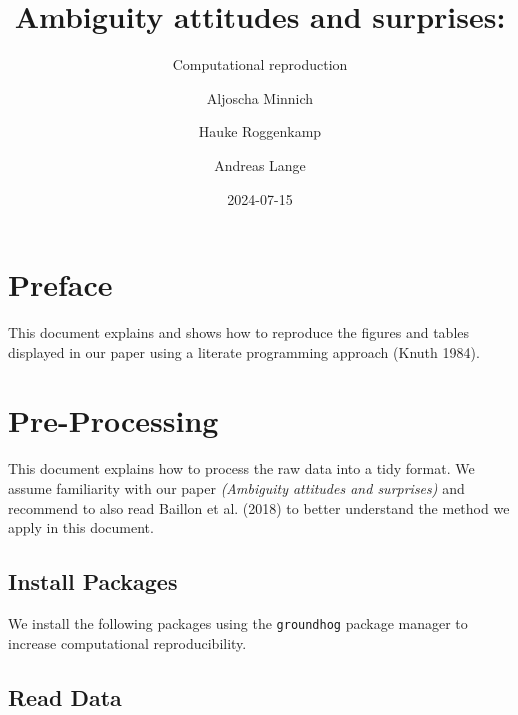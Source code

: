 \documentclass[
  a4paper,
  DIV=11,
  numbers=noendperiod]{scrreprt}
\title{Ambiguity attitudes and surprises:}
\subtitle{Computational reproduction}
\author{Aljoscha Minnich \and Hauke Roggenkamp \and Andreas Lange}
\date{2024-07-15}
\renewcommand*\contentsname{Table of contents}
\newcommand\contentsname{Table of contents}
\begin{document}
\maketitle
\ifdefined\Shaded\renewenvironment{Shaded}{\begin{tcolorbox}[breakable, frame hidden, sharp corners, enhanced, interior hidden, boxrule=0pt, borderline west={3pt}{0pt}{shadecolor}]}{\end{tcolorbox}}\fi

\renewcommand*\contentsname{Table of contents}
{
\hypersetup{linkcolor=}
\setcounter{tocdepth}{2}
\tableofcontents
}

\hypertarget{preface}{%
\chapter*{Preface}\label{preface}}


This document explains and shows how to reproduce the figures and tables
displayed in our paper using a literate programming approach (Knuth
1984).


\hypertarget{pre-processing}{%
\chapter{Pre-Processing}\label{pre-processing}}

This document explains how to process the raw data into a tidy format.
We assume familiarity with our paper \emph{(Ambiguity attitudes and
surprises)} and recommend to also read Baillon et al. (2018) to better
understand the method we apply in this document.

\hypertarget{install-packages}{%
\section{Install Packages}\label{install-packages}}

We install the following packages using the \texttt{groundhog} package
manager to increase computational reproducibility.

\hypertarget{read-data}{%
\section{Read Data}\label{read-data}}
\end{document}
